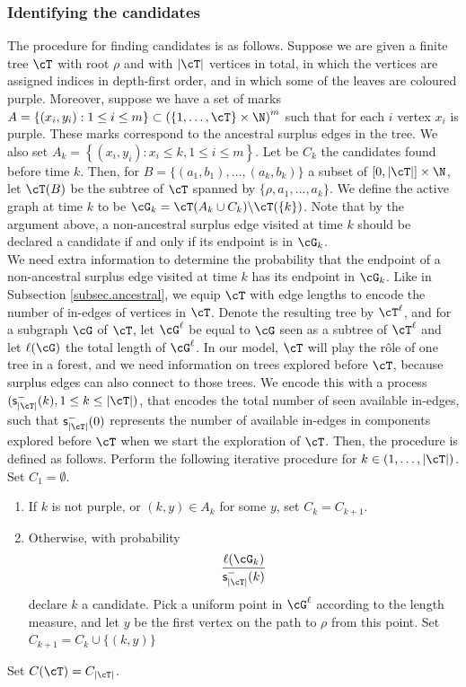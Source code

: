 \subsubsection{Identifying the candidates}
The procedure for finding candidates is as follows. Suppose we are given a finite tree $\cT$ with root $\rho$ and with $|\cT|$ vertices in total, in which the vertices are assigned indices in depth-first order, and in which some of the leaves are coloured purple. Moreover, suppose we have a set of marks $A=\left\{(x_i,y_i):1\leq i \leq m\right\}\subset \left(\{1,\dots,\cT\}\times \N\right)^m$ such that for each $i$ vertex $x_i$ is purple. These marks correspond to the ancestral surplus edges in the tree. We also set $A_k=\left\{(x_i,y_i):x_i\leq k, 1\leq i \leq m\right\}$. Let be $C_k$ the candidates found before time $k$. Then, for $B=\{(a_1,b_1),\dots,(a_k,b_k)\}$ a subset of $[0,|\cT|]\times \N$, let $\cT(B)$ be the subtree of $\cT$ spanned by $\{\rho,a_1,\dots,a_k\}$. We define the active graph at time $k$ to be $\cG_k=\cT(A_k\cup C_k)\backslash \cT(\{k\})$. Note that by the argument above, a non-ancestral surplus edge visited at time $k$ should be declared a candidate if and only if its endpoint is in $\cG_k$. \\
We need extra information to determine the probability that the endpoint of a non-ancestral surplus edge visited at time $k$ has its endpoint in $\cG_k$. Like in Subsection \ref{subsec.ancestral}, we equip $\cT$ with edge lengths to encode the number of in-edges of vertices in $\cT$. Denote the resulting tree by $\cT^\ell$, and for a subgraph $\cG$ of $\cT$, let $\cG^\ell$ be equal to $\cG$ seen as a subtree of $\cT^\ell$ and let $\ell(\cG)$ the total length of $\cG^\ell$. In our model, $\cT$ will play the rôle of one tree in a forest, and we need information on trees explored before $\cT$, because surplus edges can also connect to those trees. We encode this with a process $(\mathsf{s}^-_{|\cT|}(k),1\leq k \leq |\cT|)$, that encodes the total number of seen available in-edges, such that $\mathsf{s}^-_{|\cT|}(0)$ represents the number of available in-edges in components explored before $\cT$ when we start the exploration of $\cT$. Then, the procedure is defined as follows. Perform the following iterative procedure for $k\in(1,\dots, |\cT|)$. Set $C_1=\emptyset$.
\begin{enumerate}
    \item If $k$ is not purple, or $(k,y)\in A_k$ for some $y$, set $C_k=C_{k+1}$.
    \item Otherwise, with probability 
    $$\frac{\ell(\cG_k)}{\mathsf{s}^-_{|\cT|}(k)}$$
    declare $k$ a candidate. Pick a uniform point in $\cG^\ell$ according to the length measure, and let $y$ be the first vertex on the path to $\rho$ from this point. Set $C_{k+1}=C_k\cup\{(k,y)\}$
\end{enumerate}
Set $C(\cT)=C_{|\cT|}$. 



